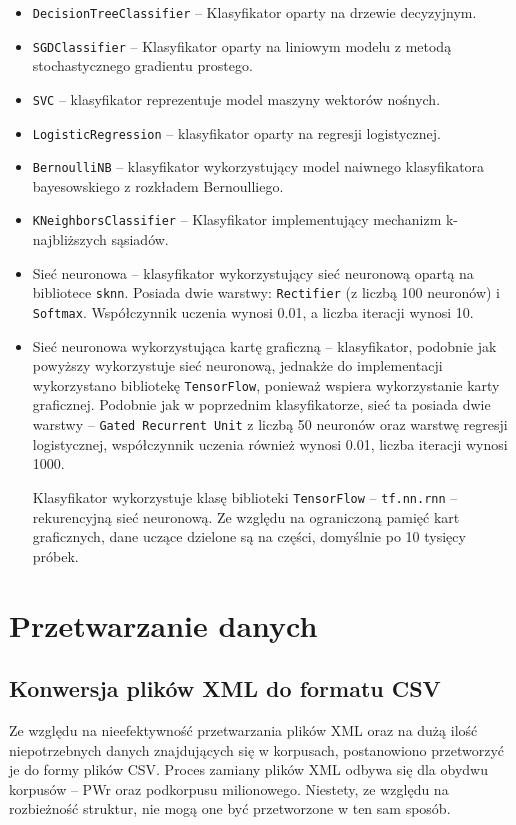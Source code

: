	\begin{itemize}
	\item \texttt{DecisionTreeClassifier} -- Klasyfikator oparty na drzewie decyzyjnym.
	\item \texttt{SGDClassifier} -- Klasyfikator oparty na liniowym modelu z metodą stochastycznego gradientu prostego.
	\item \texttt{SVC} -- klasyfikator reprezentuje model maszyny wektorów nośnych.
	\item \texttt{LogisticRegression} -- klasyfikator oparty na regresji logistycznej.
	\item \texttt{BernoulliNB} -- klasyfikator wykorzystujący model naiwnego klasyfikatora bayesowskiego z rozkładem Bernoulliego.
	\item \texttt{KNeighborsClassifier} -- Klasyfikator implementujący mechanizm k-najbliższych sąsiadów.
	\item Sieć neuronowa -- klasyfikator wykorzystujący sieć neuronową opartą na bibliotece \texttt{sknn}. Posiada dwie warstwy: \texttt{Rectifier} (z liczbą 100 neuronów) i \texttt{Softmax}. Współczynnik uczenia wynosi 0.01, a liczba iteracji wynosi 10.
	\item Sieć neuronowa wykorzystująca kartę graficzną -- klasyfikator, podobnie jak powyższy wykorzystuje sieć neuronową, jednakże do implementacji wykorzystano bibliotekę \texttt{TensorFlow}, ponieważ wspiera wykorzystanie karty graficznej. Podobnie jak w poprzednim klasyfikatorze, sieć ta posiada dwie warstwy -- \texttt{Gated Recurrent Unit} z liczbą 50 neuronów oraz warstwę regresji logistycznej, współczynnik uczenia również wynosi 0.01, liczba iteracji wynosi 1000.
	
	Klasyfikator wykorzystuje klasę biblioteki \texttt{TensorFlow} -- \texttt{tf.nn.rnn} -- rekurencyjną sieć neuronową. Ze względu na ograniczoną pamięć kart graficznych, dane uczące dzielone są na części, domyślnie po 10 tysięcy próbek.
	\end{itemize}
	
	\section{Przetwarzanie danych}
	\subsection{Konwersja plików XML do formatu CSV}
	Ze względu na nieefektywność przetwarzania plików XML oraz na dużą ilość niepotrzebnych danych znajdujących się w korpusach, postanowiono przetworzyć je do formy plików CSV.
Proces zamiany plików XML odbywa się dla obydwu korpusów -- PWr oraz podkorpusu milionowego.
	Niestety, ze względu na rozbieżność struktur, nie mogą one być przetworzone w ten sam sposób.
	
